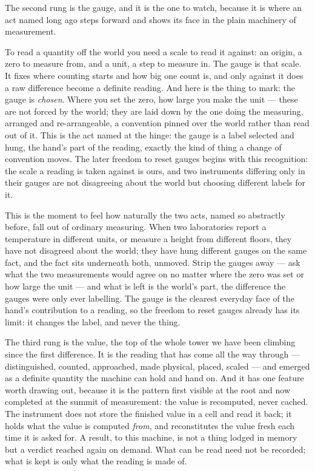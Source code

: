 The second rung is the gauge, and it is the one to watch, because it is where an act named long ago steps
forward and shows its face in the plain machinery of measurement.

To read a quantity off the world you need a scale to read it against: an origin, a zero to measure from, and a
unit, a step to measure in. The gauge is that scale. It fixes where counting starts and how big one count is,
and only against it does a raw difference become a definite reading. And here is the thing to mark: the gauge is
\emph{chosen}. Where you set the zero, how large you make the unit --- these are not forced by the world; they
are laid down by the one doing the measuring, arranged and re-arrangeable, a convention pinned over the world
rather than read out of it. This is the act named at the hinge: the gauge is a label selected and hung, the
hand's part of the reading, exactly the kind of thing a change of convention moves. The later freedom to reset
gauges begins with this recognition: the scale a reading is taken against is ours, and two instruments differing
only in their gauges are not disagreeing about the world but choosing different labels for it.

This is the moment to feel how naturally the two acts, named so abstractly before, fall out of ordinary
measuring. When two laboratories report a temperature in different units, or measure a height from different
floors, they have not disagreed about the world; they have hung different gauges on the same fact, and the fact
sits underneath both, unmoved. Strip the gauges away --- ask what the two measurements would agree on no matter
where the zero was set or how large the unit --- and what is left is the world's part, the difference the gauges
were only ever labelling. The gauge is the clearest everyday face of the hand's contribution to a reading, so the
freedom to reset gauges already has its limit: it changes the label, and never the thing.

The third rung is the value, the top of the whole tower we have been climbing since the first difference. It is
the reading that has come all the way through --- distinguished, counted, approached, made physical, placed,
scaled --- and emerged as a definite quantity the machine can hold and hand on. And it has one feature worth
drawing out, because it is the pattern first visible at the root and now completed at the summit of measurement:
the value is recomputed, never cached. The instrument does not store the finished value in a cell
and read it back; it holds what the value is computed \emph{from}, and reconstitutes the value fresh each time it
is asked for. A result, to this machine, is not a thing lodged in memory but a verdict reached again on demand.
What can be read need not be recorded; what is kept is only what the reading is made of.

